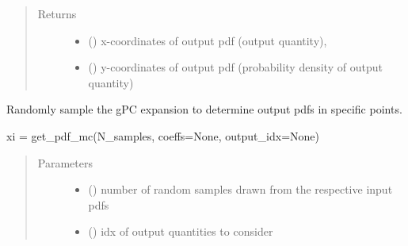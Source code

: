 \documentclass[letterpaper,10pt,english,openany,oneside]{sphinxmanual}
\begin{document}
\begin{fulllineitems}
\begin{fulllineitems}
\begin{quote}
\begin{description}
\begin{itemize}
\end{itemize}

\item[{Returns}] \leavevmode
\begin{itemize}
\item {} 
 () \textendash{} x-coordinates of output pdf (output quantity),

\item {} 
 () \textendash{} y-coordinates of output pdf (probability density of output quantity)

\end{itemize}


\end{description}\end{quote}

\end{fulllineitems}


\begin{fulllineitems}
\label{\detokenize{pygpc:pygpc.gpc.gPC.get_samples}}
Randomly sample the gPC expansion to determine output pdfs in specific points.

xi = get\_pdf\_mc(N\_samples, coeffs=None, output\_idx=None)
\begin{quote}\begin{description}
\item[{Parameters}] \leavevmode\begin{itemize}
\item {} 
 () \textendash{} number of random samples drawn from the respective input pdfs

\item {} 
 (\sphinxstyleliteralemphasis{\sphinxupquote{{[}}}\sphinxstyleliteralemphasis{\sphinxupquote{{]} }}\sphinxstyleliteralemphasis{\sphinxupquote{, }}\sphinxstyleliteralemphasis{\sphinxupquote{, }}) \textendash{} idx of output quantities to consider


\end{itemize}
\end{description}
\end{quote}
\end{fulllineitems}
\end{fulllineitems}
\end{document}
